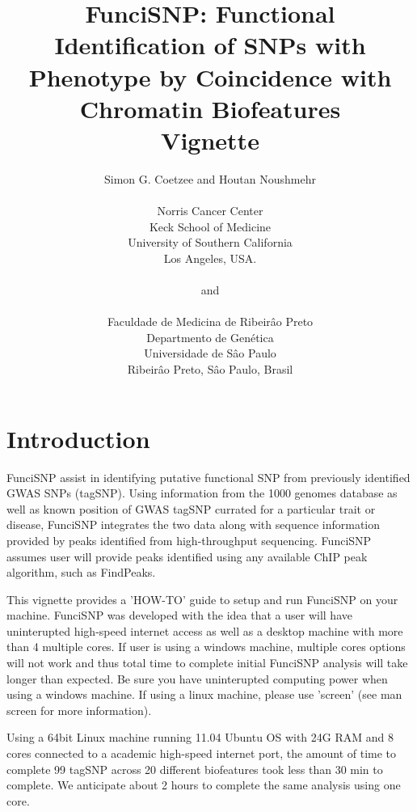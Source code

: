 \documentclass[a4paper]{article}
\begin{document}
\title{FunciSNP: Functional Identification of SNPs with\\Phenotype by 
Coincidence with Chromatin Biofeatures\\Vignette}
\author{Simon G. Coetzee and Houtan Noushmehr\\\\Norris Cancer Center\\Keck 
School of Medicine\\University of Southern California\\Los Angeles, USA.\\\\
and\\\\Faculdade de Medicina de Ribeir\^{a}o Preto\\Departmento de 
Gen\'{e}tica\\Universidade de S\^{a}o Paulo\\Ribeir\^{a}o Preto, S\^{a}o Paulo, 
Brasil}

\maketitle
\section*{Introduction}
FunciSNP assist in identifying putative functional SNP from previously
 identified GWAS SNPs (tagSNP). Using information from the 1000 genomes 
 database as well as known position of GWAS tagSNP currated for a particular 
 trait or disease, FunciSNP integrates the two data along with sequence 
 information provided by peaks identified from high-throughput sequencing. 
 FunciSNP assumes user will provide peaks identified using any available 
 ChIP peak algorithm, such as FindPeaks.

This vignette provides a 'HOW-TO' guide to setup and run FunciSNP on your 
machine. FunciSNP was developed with the idea that a user will have 
uninterupted high-speed internet access as well as a desktop machine with 
more than 4 multiple cores. If user is using a windows machine, multiple
 cores options will not work and thus total time to complete initial FunciSNP
  analysis will take longer than expected. Be sure you have uninterupted 
  computing power when using a windows machine. If using a linux machine, 
  please use 'screen' (see man screen for more information).

Using a 64bit Linux machine running 11.04 Ubuntu OS with 24G RAM and 8 cores
 connected to a academic high-speed internet port, the amount of time to 
 complete 99 tagSNP across 20 different biofeatures took less than 30 min
 to complete. We anticipate about 2 hours to complete the same analysis 
 using one core.
\end{document}
